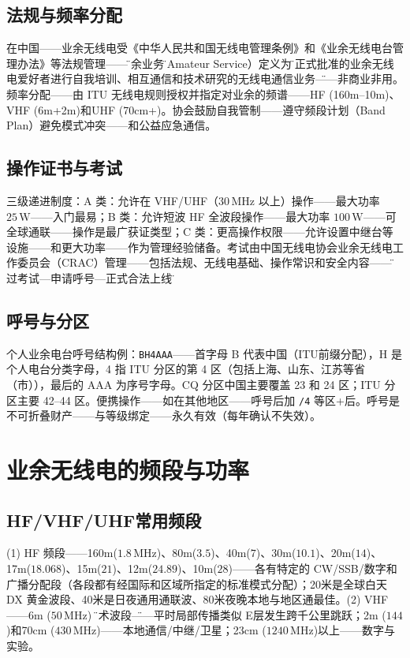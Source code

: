 \documentclass[12pt,UTF8]{ctexbook}
\begin{document}
\subsection{法规与频率分配}

在中国——业余无线电受《中华人民共和国无线电管理条例》和《业余无线电台管理办法》等法规管理——\"业余业务\"（Amateur Service）定义为\"经正式批准的业余无线电爱好者进行自我培训、相互通信和技术研究的无线电通信业务\"——非商业非用。频率分配——由 ITU 无线电规则授权并指定对业余的频谱——HF (160m–10m)、VHF (6m+2m)和UHF (70cm+)。协会鼓励自我管制——遵守频段计划（Band Plan）避免模式冲突——和公益应急通信。

\subsection{操作证书与考试}

三级递进制度：A 类：允许在 VHF/UHF（$30\,\mathrm{MHz}$ 以上）操作——最大功率 $25\,\mathrm{W}$——入门最易；B 类：允许短波 HF 全波段操作——最大功率 $100\,\mathrm{W}$——可全球通联——操作是最广获证类型；C 类：更高操作权限——允许设置中继台等设施——和更大功率——作为管理经验储备。考试由中国无线电协会业余无线电工作委员会（CRAC）管理——包括法规、无线电基础、操作常识和安全内容——\"通过考试—申请呼号—正式合法上线\"。

\subsection{呼号与分区}

个人业余电台呼号结构例：\texttt{BH4AAA}——首字母 B 代表中国（ITU前缀分配），H 是个人电台分类字母，4 指 ITU 分区的第 4 区（包括上海、山东、江苏等省（市）），最后的 AAA 为序号字母。CQ 分区中国主要覆盖 23 和 24 区；ITU 分区主要 42–44 区。便携操作——如在其他地区——呼号后加 \texttt{/4} 等区+后。呼号是不可折叠财产——与等级绑定——永久有效（每年确认不失效）。

\section{业余无线电的频段与功率}
\label{sec:ham_bands_power}

\subsection{HF/VHF/UHF常用频段}

(1) HF 频段——160m($1.8\,\mathrm{MHz}$)、80m($3.5$)、40m($7$)、30m($10.1$)、20m($14$)、17m($18.068$)、15m($21$)、12m($24.89$)、10m($28$)——各有特定的 CW/SSB/数字和广播分配段（各段都有经国际和区域所指定的标准模式分配）；20米是全球白天 DX 黄金波段、40米是日夜通用通联波、80米夜晚本地与地区通最佳。(2) VHF——6m ($50\,\mathrm{MHz}$) \"魔术波段\"——平时局部传播类似 E层发生跨千公里跳跃；2m ($144$)和70cm ($430\,\mathrm{MHz}$)——本地通信/中继/卫星；23cm ($1240\,\mathrm{MHz}$)以上——数字与实验。
\end{document}
